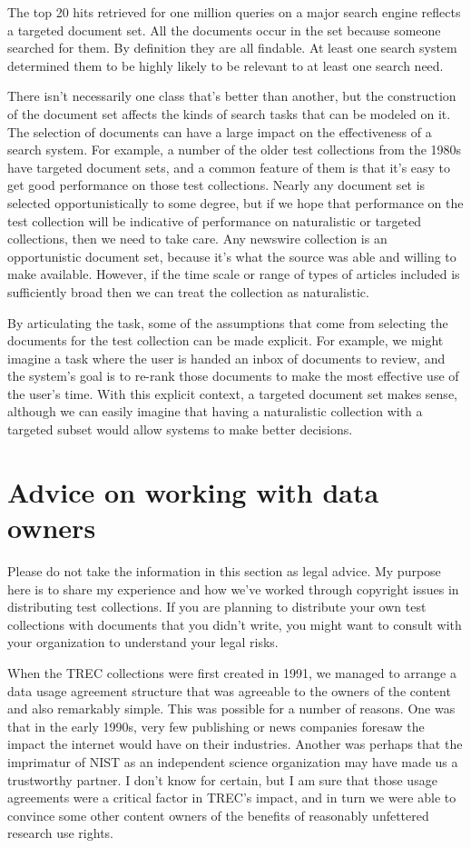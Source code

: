 \documentclass[nobib]{tufte-book}
\begin{document}
The top 20 hits retrieved for one million queries on a major search engine reflects a targeted document set.  All the documents occur in the set because someone searched for them.  By definition they are all findable.  At least one search system determined them to be highly likely to be relevant to at least one search need.

There isn't necessarily one class that's better than another, but the construction of the document set affects the kinds of search tasks that can be modeled on it.  The selection of documents can have a large impact on the effectiveness of a search system.  For example, a number of the older test collections from the 1980s have targeted document sets, and a common feature of them is that it's easy to get good performance on those test collections.  Nearly any document set is selected opportunistically to some degree, but if we hope that performance on the test collection will be indicative of performance on naturalistic or targeted collections, then we need to take care.  Any newswire collection is an opportunistic document set, because it's what the source was able and willing to make available.  However, if the time scale or range of types of articles included is sufficiently broad then we can treat the collection as naturalistic.

By articulating the task, some of the assumptions that come from selecting the documents for the test collection can be made explicit.  For example, we might imagine a task where the user is handed an inbox of documents to review, and the system's goal is to re-rank those documents to make the most effective use of the user's time.  With this explicit context, a targeted document set makes sense, although we can easily imagine that having a naturalistic collection with a targeted subset would allow systems to make better decisions.

\section{Advice on working with data owners}

Please do not take the information in this section as legal advice.  My purpose here is to share my experience and how we've worked through copyright issues in distributing test collections.  If you are planning to distribute your own test collections with documents that you didn't write, you might want to consult with your organization to understand your legal risks.

When the TREC collections were first created in 1991, we managed to arrange a data usage agreement structure that was agreeable to the owners of the content and also remarkably simple.  This was possible for a number of reasons.  One was that in the early 1990s, very few publishing or news companies foresaw the impact the internet would have on their industries.  Another was perhaps that the imprimatur of NIST as an independent science organization may have made us a trustworthy partner.  I don't know for certain, but I am sure that those usage agreements were a critical factor in TREC's impact, and in turn we were able to convince some other content owners of the benefits of reasonably unfettered research use rights.
\end{document}
